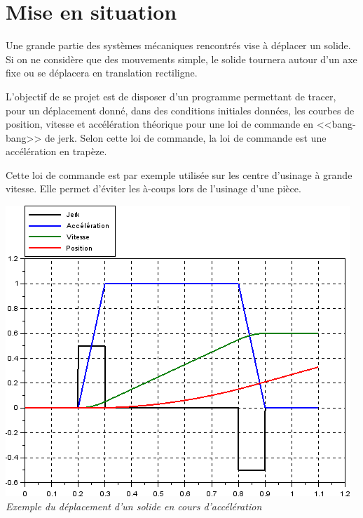 \documentclass[10pt]{article}
\newif\ifxp
\begin{document}
\ifxp

\else

\fi



 \renewcommand{\baselinestretch}{1.2}
\setlength{\parskip}{2ex plus 0.5ex minus 0.2ex}



\section{Mise en situation}
\begin{minipage}[c]{.53\linewidth}
Une grande partie des systèmes mécaniques rencontrés vise à déplacer un solide. Si on ne considère que des mouvements simple, le solide tournera autour d'un axe fixe ou se déplacera en translation rectiligne.

\begin{obj}
L'objectif de se projet est de disposer d'un programme permettant de tracer, pour un déplacement donné, dans des conditions initiales données, les courbes de position, vitesse et accélération théorique pour une loi de commande en <<bang-bang>> de jerk. Selon cette loi de commande, la loi de commande est une accélération en trapèze.
\end{obj}

Cette loi de commande est par exemple utilisée sur les centre d'usinage à grande vitesse. Elle permet d'éviter les à-coups lors de l'usinage d'une pièce.
\end{minipage} \hfill
\begin{minipage}[c]{.45\linewidth}
\begin{center}
\includegraphics[width=\textwidth]{images/bang}
\textit{Exemple du déplacement d'un solide en cours d'accélération}
\end{center}
\end{minipage}
\end{document}
